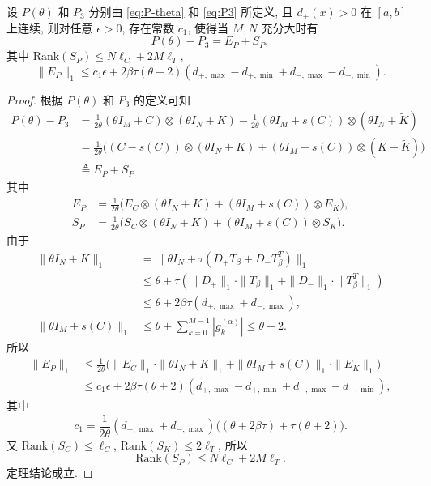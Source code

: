 \documentclass{ecnumaster}
\begin{document}
\begin{theorem}
  设 $P(\theta)$ 和 $P_3$ 分别由 \eqref{eq:P-theta} 和 \eqref{eq:P3} 所定义,
  且 $d_{\pm}(x)>0$ 在 $[a,b]$ 上连续, 
  则对任意 $\epsilon>0$, 存在常数 $c_1$, 使得当 $M,N$ 充分大时有
  $$ P(\theta) - P_3 = E_P + S_P,$$
  其中 $\mathrm{Rank}(S_P)\leq N\ell_C + 2M\ell_T$,
  $$ \|E_P\|_1 \leq c_1 \epsilon +
       2\beta\tau(\theta + 2) (d_{+,\max}-d_{+,\min}+d_{-,\max}-d_{-,\min}).
  $$
\end{theorem}
\begin{proof}
  根据 $P(\theta)$ 和 $P_3$ 的定义可知
  \begin{align*}
    P(\theta) - P_3
    & = \frac{1}{2\theta} (\theta I_M + C) \otimes (\theta I_N + K)
        -\frac{1}{2\theta} (\theta I_M + s(C)) \otimes (\theta I_N + \tilde{K})\\
    & = \frac{1}{2\theta} \Big( (C - s(C)) \otimes (\theta I_N + K)
        + (\theta I_M + s(C))\otimes(K-\tilde{K}) \Big)\\  
    & \triangleq E_P + S_P    
  \end{align*}
  其中 
  \begin{align*}
     E_P & = \frac{1}{2\theta} \Big( E_C \otimes (\theta I_N + K) + (\theta I_M + s(C))\otimes E_K \Big),\\
     S_P & = \frac{1}{2\theta} \Big( S_C \otimes (\theta I_N + K) + (\theta I_M + s(C))\otimes S_K \Big).
   \end{align*}
   由于
   \begin{align*}
     \|\theta I_N + K\|_1 
       & = \|\theta I_N + \tau (D_+ T_{\beta} + D_- T_{\beta}^T)\|_1 \\
       & \leq \theta + \tau (\|D_+\|_1\cdot\|T_{\beta}\|_1 + \|D_-\|_1\cdot\|T_{\beta}^T\|_1) \\
       & \leq \theta+2\beta\tau (d_{+,\max}+ d_{-,\max}), \\
     \|\theta I_M + s(C)\|_1
       & \leq \theta + \sum _{k=0}^{M-1}\left|g_k^{(\alpha)}\right|
         \leq \theta + 2. 
    \end{align*}
   所以
   \begin{align*}
     \|E_P\|_1 
     & \leq \frac{1}{2\theta} \Big( \|E_C\|_1 \cdot \|\theta I_N + K\|_1 
       + \|\theta I_M + s(C)\|_1\cdot \|E_K\|_1 \Big)\\
     & \leq 
       c_1 \epsilon + 
       2\beta\tau(\theta + 2) (d_{+,\max}-d_{+,\min}+d_{-,\max}-d_{-,\min}),
   \end{align*}   
   其中
   $$
     c_1  = \frac{1}{2\theta} (d_{+,\max}+ d_{-,\max}) \big( (\theta+2\beta\tau)
       + \tau(\theta + 2)\big).
   $$
   又 $\mathrm{Rank}(S_C)\leq \ell_C$, $\mathrm{Rank}(S_K)\leq 2\ell_T$, 所以
   $$ \mathrm{Rank}(S_P)\leq N\ell_C + 2M\ell_T.$$
   定理结论成立.
\end{proof}
\end{document}
